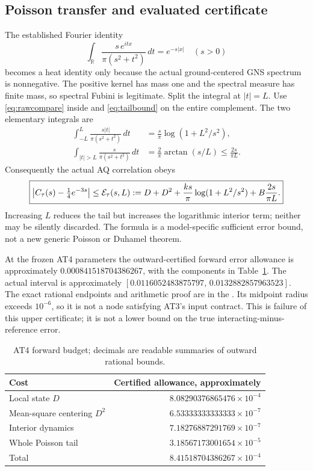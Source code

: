 \subsection{Poisson transfer and evaluated certificate}
The established Fourier identity \cite{poisson}
\begin{equation}
 \int_{\mathbb R}\frac{s\,e^{itx}}{\pi(s^2+t^2)}\,dt=e^{-s|x|}
 \quad(s>0)
 \label{eq:poisson}
\end{equation}
becomes a heat identity only because the actual ground-centered GNS spectrum
is nonnegative. The positive kernel has mass one and the spectral measure has
finite mass, so spectral Fubini is legitimate. Split the integral at $|t|=L$.
Use \eqref{eq:rawcompare} inside and \eqref{eq:tailbound} on the entire
complement. The two elementary integrals are
\begin{align}
 \int_{-L}^L\frac{s|t|}{\pi(s^2+t^2)}\,dt
 &=\frac{s}{\pi}\log(1+L^2/s^2),\\
 \int_{|t|>L}\frac{s}{\pi(s^2+t^2)}\,dt
 &=\frac2\pi\arctan(s/L)\le\frac{2s}{\pi L}.
\end{align}
Consequently the actual AQ correlation obeys
\begin{equation}
 \boxed{\left\lvert C_\tau(s)-\tfrac14e^{-3s}\right\rvert\le
 \mathcal E_\tau(s,L):=
 D+D^2+\frac{ks}{\pi}\log(1+L^2/s^2)
 +B\frac{2s}{\pi L}.}
 \label{eq:certificate}
\end{equation}
Increasing $L$ reduces the tail but increases the logarithmic interior term;
neither may be silently discarded. The formula is a model-specific sufficient
error bound, not a new generic Poisson or Duhamel theorem.

At the frozen AT4 parameters the outward-certified forward error allowance is
approximately $0.000841518704386267$, with the components in
Table~\ref{tab:capcost}. The actual interval is approximately
$[0.0116052483875797,\,0.0132882857963523]$. The exact rational endpoints and
arithmetic proof are in the
.
Its midpoint radius exceeds $10^{-6}$, so it is not a node satisfying AT3's
input contract. This is failure of this upper certificate; it is not a lower
bound on the true interacting-minus-reference error.

\begin{table}[htbp]
\centering\small
\caption{AT4 forward budget; decimals are readable summaries of outward rational bounds.}
\label{tab:capcost}
\begin{tabular}{lr}
\toprule
Cost & Certified allowance, approximately\\
\midrule
Local state $D$ & $8.08290376865476\times10^{-4}$\\
Mean-square centering $D^2$ & $6.53333333333333\times10^{-7}$\\
Interior dynamics & $7.18276887291769\times10^{-7}$\\
Whole Poisson tail & $3.18567173001654\times10^{-5}$\\
\midrule
Total & $8.41518704386267\times10^{-4}$\\
\bottomrule
\end{tabular}
\end{table}


